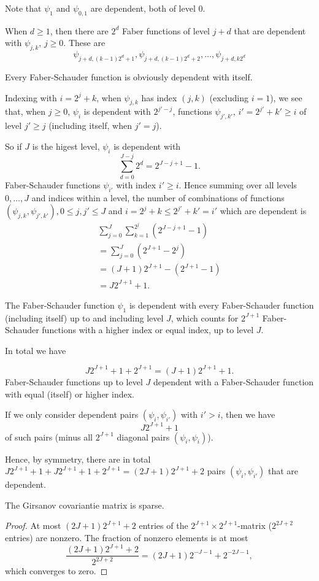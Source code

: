 \documentclass[12pt]{article}
\begin{document}
Note that \(\psi_1\) and \(\psi_{0,1}\) are dependent, both of level 0. 

When \(d\ge 1\), then there are \(2^d\) Faber functions of level \(j+d\) that are dependent with \(\psi_{j,k}\), \(j\ge 0\). These are 
\[
\psi_{j+d,(k-1)2^d+1},\psi_{j+d,(k-1)2^d+2},\ldots,\psi_{j+d,k2^d}
\]

Every Faber-Schauder function is obviously dependent with itself. 

Indexing with \(i=2^j+k\), when \(\psi_{j,k}\) has index \((j,k)\) (excluding \(i=1\)), we see that, when \(j\ge 0\), \(\psi_i\) is dependent with \(2^{j'-j}\), functions \(\psi_{j',k'}\), \(i'=2^{j'}+k'\ge i\) of level \(j'\ge j\)  (including itself, when \(j'=j\)).

So if \(J\) is the higest level, \(\psi_i\) is dependent with 
\[
\sum_{d=0}^{J-j}2^d=2^{J-j+1}-1.
\]
Faber-Schauder functions \(\psi_{i'}\) with index \(i'\ge i\). 
Hence summing over all levels \(0,\ldots,J\) and indices within a level, the number of combinations of functions \((\psi_{j,k},\psi_{j',k'}),0\le j,j'\le J\) and  \(i=2^j+k\le 2^{j'}+k'=i'\) which are dependent is
\begin{align*}
\sum_{j=0}^J\sum_{k=1}^{2^j}(2^{J-j+1}-1)\\
=\sum_{j=0}^J(2^{J+1}-2^j)\\
=(J+1)2^{J+1}-(2^{J+1}-1)\\
=J2^{J+1}+1. 
\end{align*}

The Faber-Schauder function \(\psi_1\) is dependent with every Faber-Schauder function (including itself) up to and including level \(J\), which counts for \(2^{J+1}\) Faber-Schauder functions with a higher index or equal index, up to level \(J\). 

In total we have 

\[
J2^{J+1}+1+2^{J+1}=(J+1)2^{J+1}+1. 
\]
Faber-Schauder functions up to level \(J\) dependent with a Faber-Schauder function with equal (itself) or higher index. 


If we only consider dependent pairs \((\psi_i,\psi_{i'})\) with \(i'>i\), then we have 
\[
J2^{J+1}+1
\]
of such pairs (minus all \(2^{J+1}\) diagonal pairs \((\psi_i,\psi_i)\)).

Hence, by symmetry, there are in total \(J2^{J+1}+1+J2^{J+1}+1+2^{J+1}=(2J+1)2^{J+1}+2\) pairs \((\psi_i,\psi_{i'})\) that are dependent.

\begin{lemma}
	The Girsanov covariantie matrix is sparse.
\end{lemma}
\begin{proof}
	At most \((2J+1)2^{J+1}+2\) entries of the \(2^{J+1}\times 2^{J+1}\)-matrix (\(2^{2J+2}\) entries) are nonzero. The fraction of nonzero elements is at most
	\[
	\frac{(2J+1)2^{J+1}+2}{2^{2J+2}}=(2J+1)2^{-J-1}+2^{-2J-1},
	\]
	which converges to zero. 
\end{proof}
\end{document}
